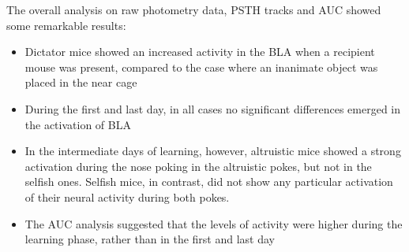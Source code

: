 \documentclass[a4paper]{article}
\begin{document}
The overall analysis on raw photometry data, PSTH tracks and AUC showed some remarkable results:

\begin{itemize}
	
	\item Dictator mice showed an increased activity in the BLA when a recipient mouse was present, compared to the case where an inanimate object was placed in the near cage
	
	\item During the first and last day, in all cases no significant differences emerged in the activation of BLA
	
	\item In the intermediate days of learning, however, altruistic mice showed a strong activation during the nose poking in the altruistic pokes, but not in the selfish ones. Selfish mice, in contrast, did not show any particular activation of their neural activity during both pokes. 
	
	\item The AUC analysis suggested that the levels of activity were higher during the learning phase, rather than in the first and last day
\end{itemize}
\end{document}
